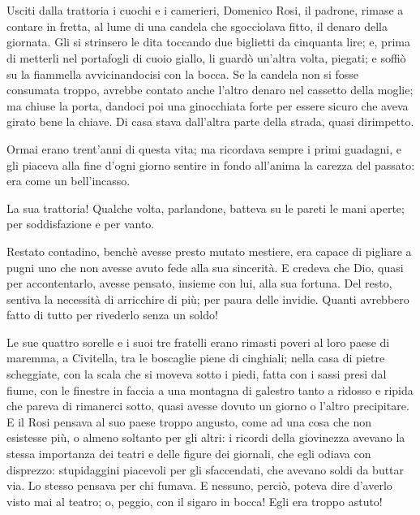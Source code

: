 \chapter{}

Usciti dalla trattoria i cuochi e i camerieri, Domenico Rosi, il padrone, rimase a contare in fretta, al lume di una candela che sgocciolava fitto, il denaro della giornata. Gli si strinsero le dita toccando due biglietti da cinquanta lire; e, prima di metterli nel portafogli di cuoio giallo, li guardò un’altra volta, piegati; e soffiò su la fiammella avvicinandocisi con la bocca. Se la candela non si fosse consumata troppo, avrebbe contato anche l’altro denaro nel cassetto della moglie; ma chiuse la porta, dandoci poi una ginocchiata forte per essere sicuro che aveva girato bene la chiave. Di casa stava dall’altra parte della strada, quasi dirimpetto.

Ormai erano trent’anni di questa vita; ma ricordava sempre i primi guadagni, e gli piaceva alla fine d’ogni giorno sentire in fondo all’anima la carezza del passato: era come un bell’incasso.

La sua trattoria! Qualche volta, parlandone, batteva su le pareti le mani aperte; per soddisfazione e per vanto.

Restato contadino, benchè avesse presto mutato mestiere, era capace di pigliare a pugni uno che non avesse avuto fede alla sua sincerità. E credeva che Dio, quasi per accontentarlo, avesse pensato, insieme con lui, alla sua fortuna. Del resto, sentiva la necessità di arricchire di più; per paura delle invidie. Quanti avrebbero fatto di tutto per rivederlo senza un soldo!

Le sue quattro sorelle e i suoi tre fratelli erano rimasti poveri al loro paese di maremma, a Civitella, tra le boscaglie piene di cinghiali; nella casa di pietre scheggiate, con la scala che si moveva sotto i piedi, fatta con i sassi presi dal fiume, con le finestre in faccia a una montagna di galestro tanto a ridosso e ripida che pareva di rimanerci sotto, quasi avesse dovuto un giorno o l’altro precipitare. E il Rosi pensava al suo paese troppo angusto, come ad una cosa che non esistesse più, o almeno soltanto per gli altri: i ricordi della giovinezza avevano la stessa importanza dei teatri e delle figure dei giornali, che egli odiava con disprezzo: stupidaggini piacevoli per gli sfaccendati, che avevano soldi da buttar via. Lo stesso pensava per chi fumava. E nessuno, perciò, poteva dire d’averlo visto mai al teatro; o, peggio, con il sigaro in bocca! Egli era troppo astuto!

